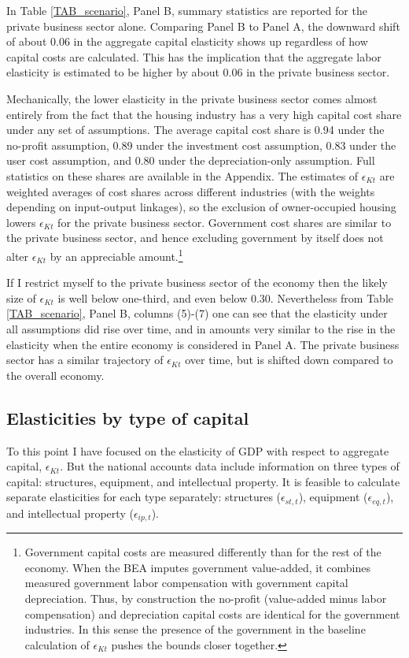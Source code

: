 \documentclass[11pt]{article}
\begin{document}
In Table \ref{TAB_scenario}, Panel B, summary statistics are reported for the private business sector alone. Comparing Panel B to Panel A, the downward shift of about 0.06 in the aggregate capital elasticity shows up regardless of how capital costs are calculated. This has the implication that the aggregate labor elasticity is estimated to be higher by about 0.06 in the private business sector. 

Mechanically, the lower elasticity in the private business sector comes almost entirely from the fact that the housing industry has a very high capital cost share under any set of assumptions. The average capital cost share is 0.94 under the no-profit assumption, 0.89 under the investment cost assumption, 0.83 under the user cost assumption, and 0.80 under the depreciation-only assumption. Full statistics on these shares are available in the Appendix. The estimates of $\epsilon_{Kt}$ are weighted averages of cost shares across different industries (with the weights depending on input-output linkages), so the exclusion of owner-occupied housing lowers $\epsilon_{Kt}$ for the private business sector. Government cost shares are similar to the private business sector, and hence excluding government by itself does not alter $\epsilon_{Kt}$ by an appreciable amount.\footnote{Government capital costs are measured differently than for the rest of the economy. When the BEA imputes government value-added, it combines measured government labor compensation with government capital depreciation. Thus, by construction the no-profit (value-added minus labor compensation) and depreciation capital costs are identical for the government industries. In this sense the presence of the government in the baseline calculation of $\epsilon_{Kt}$ pushes the bounds closer together.}

If I restrict myself to the private business sector of the economy then the likely size of $\epsilon_{Kt}$ is well below one-third, and even below 0.30. Nevertheless from Table \ref{TAB_scenario}, Panel B, columns (5)-(7) one can see that the elasticity under all assumptions did rise over time, and in amounts very similar to the rise in the elasticity when the entire economy is considered in Panel A. The private business sector has a similar trajectory of $\epsilon_{Kt}$ over time, but is shifted down compared to the overall economy.

\subsection{Elasticities by type of capital}
To this point I have focused on the elasticity of GDP with respect to aggregate capital, $\epsilon_{Kt}$. But the national accounts data include information on three types of capital: structures, equipment, and intellectual property. It is feasible to calculate separate elasticities for each type separately: structures ($\epsilon_{st,t}$), equipment ($\epsilon_{eq,t}$), and intellectual property ($\epsilon_{ip,t}$).
\end{document}
